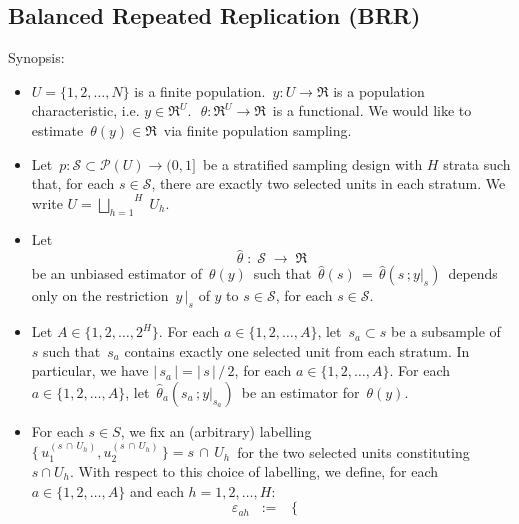 

\subsection{Balanced Repeated Replication (BRR)}

\vskip 0.2cm
\begin{proposition}
\mbox{}\vskip 0.1cm
\noindent
Synopsis:
\begin{itemize}
\item
	$U = \{1,2,\ldots,N\}$\; is a finite population.
	\,$y : U \longrightarrow \Re$\; is a population characteristic, i.e. \;$y \in \Re^{U}$.\,
	\,$\theta : \Re^{U} \longrightarrow \Re$\, is a functional.
	We would like to estimate \,$\theta(y) \in \Re$\, via finite population sampling.
\item
	Let \,$p : \mathcal{S} \subset \mathcal{P}(U) \longrightarrow (0,1]$\, be a stratified
	sampling design with $H$ strata such that, for each $s \in \mathcal{S}$, there are
	exactly two selected units in each stratum.
	We write $U = \overset{H}{\underset{h = 1}{\bigsqcup}}\;U_{h}$.
\item
	Let
	\begin{equation*}
	\widehat{\theta} \; : \; \mathcal{S} \; \longrightarrow \; \Re
	\end{equation*}
	be an unbiased estimator of \,$\theta(y)$\, such that
	\,$\widehat{\theta}(s) \, = \, \widehat{\theta}(s\,;y\vert_{s})$\,
	depends only on the restriction \,$y\,\vert_{s}$ of $y$ to $s \in \mathcal{S}$,
	for each $s \in \mathcal{S}$.
\item
	Let $A \in \{1,2,\ldots,2^{H}\}$.
	For each $a \in \{1,2,\ldots,A\}$, let \,$s_{a} \subset s$ be a subsample of $s$
	such that \,$s_{a}$ contains exactly one selected unit from each stratum.
	In particular, we have $\vert\,s_{a}\,\vert = \vert\,s\,\vert\,/\,2$, for each $a \in \{1,2,\ldots,A\}$.
	For each $a \in \{1,2,\ldots,A\}$, let \,$\widehat{\theta}_{a}(s_{a}\,;y\vert_{s_{a}})$\, be an
	estimator for \,$\theta(y)$.	
\item
	For each $s \in S$, we fix an (arbitrary) labelling
	\,$\{\,u^{(s\,\cap\,U_{h})}_{1}, u^{(s\,\cap\,U_{h})}_{2}\,\} = s \,\cap\, U_{h}$\,
	for the two selected units constituting $s \cap U_{h}$.
	With respect to this choice of labelling, we define,
	for each $a \in \{1,2,\ldots,A\}$ and each $h = 1,2,\ldots,H$:
	\begin{equation*}
	\varepsilon_{ah}
	\;\; := \;\;
		\left\{\begin{array}{rl}

\end{array}
\end{equation*}
\end{itemize}
\end{proposition}
